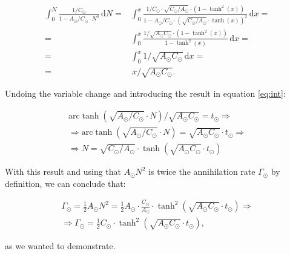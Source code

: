 \begin{equation}
	\begin{aligned}
	\int_0^N \frac{1/C_\odot}{1 - A_\odot/C_\odot \cdot N^2} \, \mathrm{d}N =&
	\int_0^x \frac{1/C_\odot \cdot  \sqrt{C_\odot/A_\odot}  \cdot  \left(1-\tanh^2(x)\right)}{1-A_\odot/C_\odot  \cdot \left( \sqrt{C_\odot/A_\odot} \cdot \tanh(x) \right)^2} \, \mathrm{d}x =  \\
	=& \int_0^x \frac{1/\sqrt{A_\odot C_\odot}  \cdot  \left(1-\tanh^2(x)\right)}{1- \tanh^2(x)} \, \mathrm{d}x = \\
	=& \int_0^x 1/\sqrt{A_\odot C_\odot} \, \mathrm{d}x = \\
	=& \,x/\sqrt{A_\odot C_\odot}.
	\end{aligned}
\end{equation}

Undoing the variable change and introducing the result in equation \ref{eq:int}:

\begin{equation}
	\begin{gathered}
		\textrm{arc}\tanh\left(\sqrt{A_\odot/C_\odot} \cdot N\right) /  \sqrt{A_\odot C_\odot} = t_\odot \Longrightarrow \\
		\Longrightarrow \textrm{arc}\tanh\left(\sqrt{A_\odot/C_\odot} \cdot N\right) = \sqrt{A_\odot C_\odot} \cdot t_\odot \Longrightarrow \\
		\Longrightarrow \boxed{ N = \sqrt{C_\odot/A_\odot} \cdot \tanh\left(\sqrt{A_\odot C_\odot} \cdot t_\odot \right)}
	\end{gathered}
\end{equation}

With this result and using that $A_\odot N^2$ is twice the annihilation rate $\Gamma_\odot$ by definition, we can conclude that:

\begin{equation}
	\begin{gathered}
		\Gamma_\odot = \frac{1}{2}A_\odot N^2 = \frac{1}{2}A_\odot \cdot \frac{C_\odot}{A_\odot} \cdot \tanh^2\left(\sqrt{A_\odot C_\odot} \cdot t_\odot \right) \Longrightarrow \\
		\Longrightarrow \boxed{\Gamma_\odot = \frac{1}{2} C_\odot \cdot \tanh^2\left(\sqrt{A_\odot C_\odot} \cdot t_\odot \right)},
	\end{gathered}
\end{equation}

as we wanted to demonstrate.